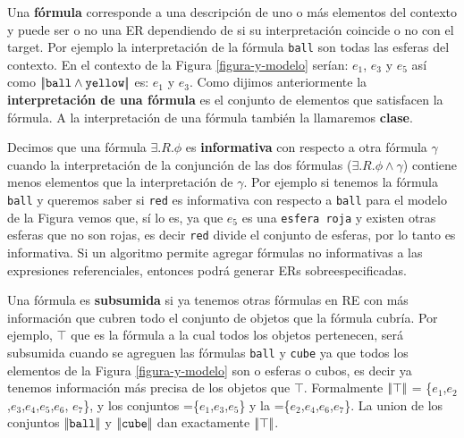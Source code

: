 Una \textbf{f\'ormula} corresponde a una descripci\'on de uno o m\'as elementos del contexto y puede ser o no una ER dependiendo de 
si su interpretaci\'on coincide o no con el target. Por ejemplo la interpretaci\'on de la f\'ormula \texttt{ball} son todas las esferas 
del contexto. En el contexto de la Figura \ref{figura-y-modelo} ser\'ian: $e_1$, $e_3$ y $e_5$  as\'i como $|\!|\texttt{ball} \land \texttt{yellow}|\!|$ es: $e_1$ y $e_3$.
Como dijimos anteriormente la \textbf{interpretaci\'on de una f\'ormula} es el conjunto de elementos que satisfacen la f\'ormula. A la interpretaci\'on de una f\'ormula tambi\'en la llamaremos \textbf{clase}.

Decimos que una f\'ormula $\exists.R. \phi$ es \textbf{informativa} con respecto a otra f\'ormula $\gamma$ cuando la interpretaci\'on de la conjunci\'on de las dos f\'ormulas ($\exists.R. \phi \land \gamma$) contiene menos elementos que la interpretaci\'on de $\gamma$. Por ejemplo si tenemos la f\'ormula \texttt{ball} y 
queremos saber si \texttt{red} es informativa con respecto a \texttt{ball} para el modelo de la Figura vemos que, s\'i lo es, ya que $e_5$ es una \texttt{esfera roja} y existen otras esferas que no son rojas,
 es decir \texttt{red} divide el conjunto de esferas, por lo tanto es informativa. Si un algoritmo permite agregar f\'ormulas no informativas a las expresiones referenciales, entonces podr\'a generar ERs sobreespecificadas.

Una f\'ormula es \textbf{subsumida} si ya tenemos otras f\'ormulas en RE con m\'as informaci\'on que cubren todo el conjunto de objetos que 
la f\'ormula cubr\'ia. Por ejemplo, $\top$ que es la f\'ormula a la cual todos los objetos pertenecen, ser\'a subsumida cuando se agreguen 
las f\'ormulas \texttt{ball} y \texttt{cube} ya que todos los elementos de la Figura \ref{figura-y-modelo} son o esferas o cubos, 
es decir ya tenemos informaci\'on m\'as precisa de los objetos que $\top$. Formalmente $|\!|\top|\!|$ = \{$e_1$,$e_2$,$e_3$,$e_4$,$e_5$,$e_6$, $e_7$\}, y los conjuntos =\{$e_1$,$e_3$,$e_5$\} y la =\{$e_2$,$e_4$,$e_6$,$e_7$\}. La union de los conjuntos $|\!|\texttt{ball}|\!|$ y $|\!|\texttt{cube}|\!|$ dan exactamente $|\!|\top|\!|$.



